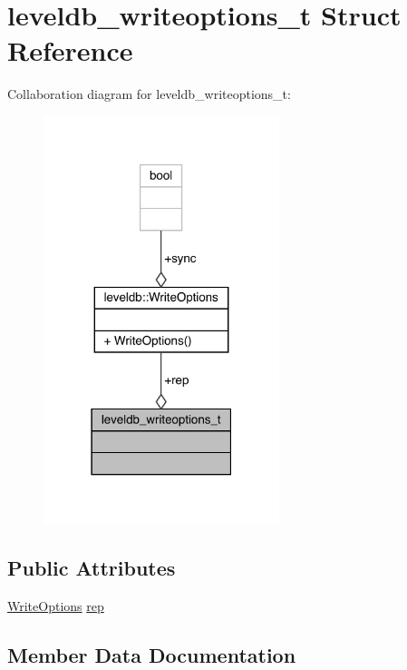 \hypertarget{structleveldb__writeoptions__t}{}\section{leveldb\+\_\+writeoptions\+\_\+t Struct Reference}
\label{structleveldb__writeoptions__t}


Collaboration diagram for leveldb\+\_\+writeoptions\+\_\+t\+:
\nopagebreak
\begin{figure}[H]
\begin{center}
\leavevmode
\includegraphics[width=195pt]{structleveldb__writeoptions__t__coll__graph}
\end{center}
\end{figure}
\subsection*{Public Attributes}
\begin{DoxyCompactItemize}
\item 
\mbox{\hyperlink{structleveldb_1_1_write_options}{Write\+Options}} \mbox{\hyperlink{structleveldb__writeoptions__t_ad51ccdc92007bd69dcb075bba4aef788}{rep}}
\end{DoxyCompactItemize}


\subsection{Member Data Documentation}
\mbox{\label{structleveldb__writeoptions__t_ad51ccdc92007bd69dcb075bba4aef788}} 
